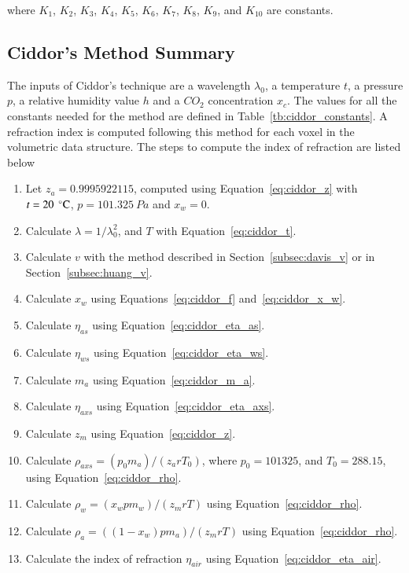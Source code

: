where $K_1$, $K_2$, $K_3$, $K_4$, $K_5$, $K_6$, $K_7$, $K_8$, $K_9$, and $K_{10}$ are constants.

\subsection{Ciddor's Method Summary}

The inputs of Ciddor's technique are a wavelength $\lambda_0$, a temperature $t$, a pressure $p$, a relative humidity value $h$ and a $CO_2$ concentration $x_c$.
The values for all the constants needed for the method are defined in Table~\ref{tb:ciddor_constants}.
A refraction index is computed following this method for each voxel in the volumetric data structure.
The steps to compute the index of refraction are listed below

\begin{enumerate}
\item Let $z_a = 0.9995922115$, computed using Equation~\ref{eq:ciddor_z} with $t = 20~\,^{\circ}{\rm C}$, $p = 101.325~Pa$ and $x_w=0$.
\item Calculate $\lambda = 1 / \lambda_0^2$, and $T$ with Equation~\ref{eq:ciddor_t}.
\item Calculate $v$ with the method described in Section~\ref{subsec:davis_v} or in Section~\ref{subsec:huang_v}.
\item Calculate $x_w$ using Equations~\ref{eq:ciddor_f} and~\ref{eq:ciddor_x_w}.
\item Calculate $\eta_{as}$ using Equation~\ref{eq:ciddor_eta_as}.
\item Calculate $\eta_{ws}$ using Equation~\ref{eq:ciddor_eta_ws}.
\item Calculate $m_a$ using Equation~\ref{eq:ciddor_m_a}.
\item Calculate $\eta_{axs}$ using Equation~\ref{eq:ciddor_eta_axs}.
\item Calculate $z_m$ using Equation~\ref{eq:ciddor_z}.
\item Calculate $\rho_{axs} = (p_0 m_a)/(z_a r T_0)$, where $p_0 = 101325$, and $T_0 = 288.15$, using Equation~\ref{eq:ciddor_rho}.
\item Calculate $\rho_{w} = (x_w p m_w)/(z_m r T)$ using Equation~\ref{eq:ciddor_rho}.
\item Calculate $\rho_{a} = ((1 - x_w) p m_a)/(z_m r T)$ using Equation~\ref{eq:ciddor_rho}.
\item Calculate the index of refraction $\eta_{air}$ using Equation~\ref{eq:ciddor_eta_air}.
\end{enumerate}

